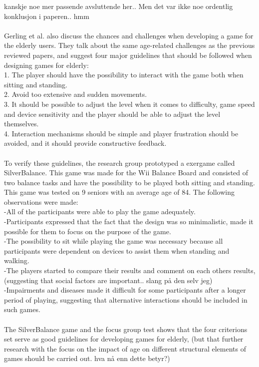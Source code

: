 kanskje noe mer passende avsluttende her.. Men det var ikke noe ordentlig konklusjon i paperen.. hmm \\ \\
Gerling et al. also discuss the chances and challenges when developing a game for the elderly users. They talk about the same age-related challenges as the previous reviewed papers, and suggest four major guidelines that should be followed when designing games for elderly: \\
1. The player should have the possibility to interact with the game both when sitting and standing. \\
2. Avoid too extensive and sudden movements.\\
3. It should be possible to adjust the level when it comes to difficulty, game speed and device sensitivity and the player should be able to adjust the level themselves. \\
4. Interaction mechanisms should be simple and player frustration should be avoided, and it should provide constructive feedback.\\ \\
To verify these guidelines, the research group prototyped a exergame called SilverBalance. This game was made for the Wii Balance Board and consisted of two balance tasks and have the possibility to be played both sitting and standing. This game was tested on 9 seniors with an average age of 84. The following observations were made: \\
-All of the participants were able to play the game adequately. \\
-Participants expressed that the fact that the design was so minimalistic, made it possible for them to focus on the purpose of the game. \\
-The possibility to sit while playing the game was necessary because all participants were dependent on devices to assist them when standing and walking.\\
-The players started to compare their results and comment on each others results, (suggesting that social factors are important.. slang på den selv jeg)\\
-Impairments and diseases made it difficult for some participants after a longer period of playing, suggesting that alternative interactions should be included in such games.\\ \\
The SilverBalance game and the focus group test shows that the four criterions set serve as good guidelines for developing games for elderly, (but that further research with the focus on the impact of age on different structural elements of games should be carried out. hva nå enn dette betyr?)\\ \\
